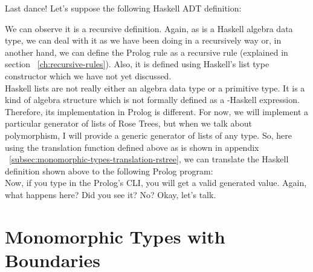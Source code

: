 \begin{example}
	Last dance! Let's suppose the following Haskell ADT definition:
	
	We can observe it is a recursive definition. Again, as  is a Haskell algebra data type, we can deal with it as we have been doing in a recursively way or, in another hand, we can define the Prolog rule as a recursive rule (explained in section ~\ref{ch:recursive-rules}). Also, it is defined using Haskell's list type constructor which we have not yet discussed. \\
							
	Haskell lists are not really either an algebra data type or a primitive type. It is a kind of algebra structure which is not formally defined as a -Haskell expression. Therefore, its implementation in Prolog is different. For now, we will implement a particular generator of lists of Rose Trees, but when we talk about polymorphism, I will provide a generic generator of lists of any type. So, here using the translation function defined above as is shown in appendix ~\ref{subsec:monomorphic-types-translation-rstree}, we can translate the Haskell definition shown above to the following Prolog program:\\
	
	Now, if you type  in the Prolog's CLI, you will get a valid  generated value. Again, what happens here? Did you see it? No? Okay, let's talk.\\
\end{example}

\section{Monomorphic Types with Boundaries} \label{ch:monomorphic-types-boundaries}

